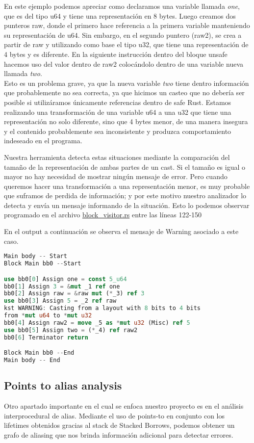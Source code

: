 En este ejemplo podemos apreciar como declaramos una variable llamada \textit{one}, que es del tipo u64 y tiene una representación en 8 bytes. Luego creamos dos punteros raw, donde el primero hace referencia a la primera variable manteniendo su representación de u64. Sin embargo, en el segundo puntero (raw2), se crea a partir de raw y utilizando como base el tipo u32, que tiene una representación de 4 bytes y es diferente. En la siguiente instrucción dentro del bloque unsafe hacemos uso del valor dentro de raw2 colocándolo dentro de una variable nueva llamada \textit{two}.\\
Esto es un problema grave, ya que la nueva variable \textit{two} tiene dentro información que probablemente no sea correcta, ya que hicimos un casteo que no debería ser posible si utilizáramos únicamente referencias dentro de safe Rust. Estamos realizando una transformación de una variable u64 a una u32 que tiene una representación no solo diferente, sino que 4 bytes menor, de una manera insegura y el contenido probablemente sea inconsistente y produzca comportamiento indeseado en el programa.

Nuestra herramienta detecta estas situaciones mediante la comparación del tamaño de la representación de ambas partes de un cast. Si el tamaño es igual o mayor no hay necesidad de mostrar ningún mensaje de error. Pero cuando queremos hacer una transformación a una representación menor, es muy probable que suframos de perdida de información; y por este motivo nuestro analizador lo detecta y envía un mensaje informando de la situación. Esto lo podemos observar programado en el archivo \href{run:../src/mir_visitor/block_visitor.rs}{block\_visitor.rs} entre las líneas 122-150

En el output a continuación se observa el mensaje de Warning asociado a este caso.

\begin{lstlisting}[language=rust]
Main body -- Start
Block Main bb0 --Start

use bb0[0] Assign one = const 5_u64
bb0[1] Assign 3 = &mut _1 ref one
bb0[2] Assign raw = &raw mut (*_3) ref 3
use bb0[3] Assign 5 = _2 ref raw
kst WARNING: Casting from a layout with 8 bits to 4 bits
from *mut u64 to *mut u32
bb0[4] Assign raw2 = move _5 as *mut u32 (Misc) ref 5
use bb0[5] Assign two = (*_4) ref raw2
bb0[6] Terminator return

Block Main bb0 --End
Main body -- End
\end{lstlisting}

\subsection{Points to alias analysis}
Otro apartado importante en el cual se enfoca nuestro proyecto es en el análisis interprocedural de alias. Mediante el uso de points-to en conjunto con los lifetimes obtenidos gracias al stack de Stacked Borrows, podemos obtener un grafo de aliasing que nos brinda información adicional para detectar errores.

